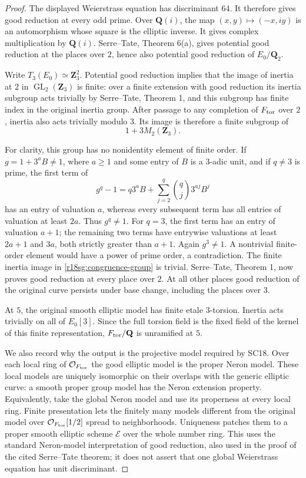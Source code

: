 \begin{proof}
The displayed Weierstrass equation has discriminant \(64\).
It therefore gives good reduction at every odd prime.
Over \(\mathbf Q(i)\), the map
\((x,y)\mapsto(-x,iy)\) is an automorphism whose square is
the elliptic inverse.  It gives complex multiplication
by \(\mathbf Q(i)\).  Serre--Tate, Theorem 6(a), gives
potential good reduction at the places over \(2\), hence
also potential good reduction of \(E_0/\mathbf Q_2\).

Write \(T_3(E_0)\simeq\mathbf Z_3^2\).
Potential good reduction implies that the image of inertia
at \(2\) in \(\operatorname{GL}_2(\mathbf Z_3)\) is finite:
over a finite extension with good reduction its inertia
subgroup acts trivially by Serre--Tate, Theorem 1, and this
subgroup has finite index in the original inertia group.
After passage to any completion of \(F_{\rm tor}\) over
\(2\), inertia also acts trivially modulo \(3\).  Its image
is therefore a finite subgroup of
\[
                    1+3M_2(\mathbf Z_3).
 \tag{SG18.3}\label{r18sg:congruence-group}
\]

For clarity, this group has no nonidentity element of finite
order.  If \(g=1+3^aB\ne1\), where \(a\ge1\) and some entry
of \(B\) is a \(3\)-adic unit, and if \(q\ne3\) is prime,
the first term of
\[
                  g^q-1=q3^aB+\sum_{j=2}^q
                            \binom qj3^{aj}B^j
\]
has an entry of valuation \(a\), whereas every subsequent
term has all entries of valuation at least \(2a\).
Thus \(g^q\ne1\).  For \(q=3\), the first term has an entry
of valuation \(a+1\); the remaining two terms have entrywise
valuations at least \(2a+1\) and \(3a\), both strictly
greater than \(a+1\).  Again \(g^3\ne1\).
A nontrivial finite-order element would have a power of
prime order, a contradiction.  The finite inertia image
in \eqref{r18sg:congruence-group} is trivial.
Serre--Tate, Theorem 1, now proves good reduction at every
place over \(2\).  At all other places good reduction of
the original curve persists under base change, including
the places over \(3\).

At \(5\), the original smooth elliptic model has finite
etale \(3\)-torsion.  Inertia acts trivially on all of
\(E_0[3]\).  Since the full torsion field is the fixed
field of the kernel of this finite representation,
\(F_{\rm tor}/\mathbf Q\) is unramified at \(5\).

We also record why the output is the projective model
required by SC18.  Over each local ring of
\(\mathcal O_{F_{\rm tor}}\) the good elliptic model is the
proper Neron model.  These local models are uniquely
isomorphic on their overlaps with the generic elliptic
curve: a smooth proper group model has the Neron
extension property.  Equivalently, take the global
Neron model and use its properness at every local ring.
Finite presentation lets the finitely many models
different from the original model over
\(\mathcal O_{F_{\rm tor}}[1/2]\) spread to neighborhoods.
Uniqueness patches them to a proper smooth elliptic
scheme \(\mathcal E\) over the whole number ring.
This uses the standard Neron-model interpretation of
good reduction, also used in the proof of the cited
Serre--Tate theorem; it does not assert that one global
Weierstrass equation has unit discriminant.


\end{proof}
